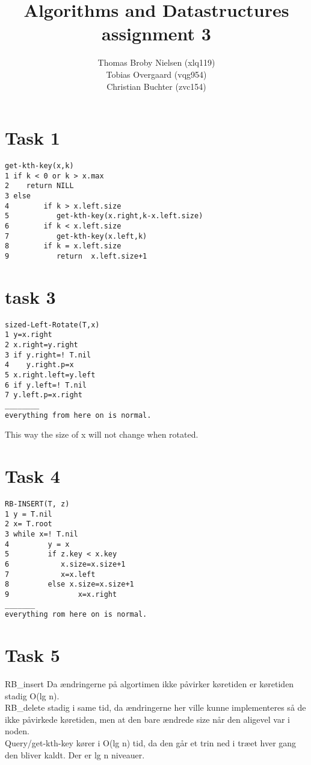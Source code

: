 \documentclass[12pt]{article}
\title{Algorithms and Datastructures assignment 3}
\author{Thomas Broby Nielsen (xlq119)\\ Tobias Overgaard (vqg954)\\ Christian Buchter (zvc154)}
\begin{document}
\maketitle

\tableofcontents

\pagebreak
\section{Task 1}
\begin{verbatim}
get-kth-key(x,k)
1 if k < 0 or k > x.max
2    return NILL
3 else
4        if k > x.left.size
5           get-kth-key(x.right,k-x.left.size)
6        if k < x.left.size
7           get-kth-key(x.left,k)
8        if k = x.left.size
9           return  x.left.size+1
\end{verbatim}

\newpage
\section{task 3}
\begin{verbatim}
sized-Left-Rotate(T,x)
1 y=x.right
2 x.right=y.right
3 if y.right=! T.nil
4    y.right.p=x
5 x.right.left=y.left
6 if y.left=! T.nil
7 y.left.p=x.right
________
everything from here on is normal.
\end{verbatim}
This way the size of x will not change when rotated.
\newpage

\section{Task 4}
\begin{verbatim}
RB-INSERT(T, z)
1 y = T.nil
2 x= T.root
3 while x=! T.nil
4         y = x
5         if z.key < x.key
6            x.size=x.size+1
7            x=x.left
8         else x.size=x.size+1
9                x=x.right
_______
everything rom here on is normal.
\end{verbatim}
\newpage

\section{Task 5}
RB\_insert Da ændringerne på algortimen ikke påvirker køretiden er køretiden stadig O(lg n).\\
RB\_delete stadig i same tid, da ændringerne her ville kunne implementeres så de ikke påvirkede køretiden, men at den bare ændrede size når den aligevel var i noden.\\
Query/get-kth-key kører i O(lg n) tid, da den går et trin ned i træet hver gang den bliver kaldt. Der er lg n niveauer.
\end{document}
